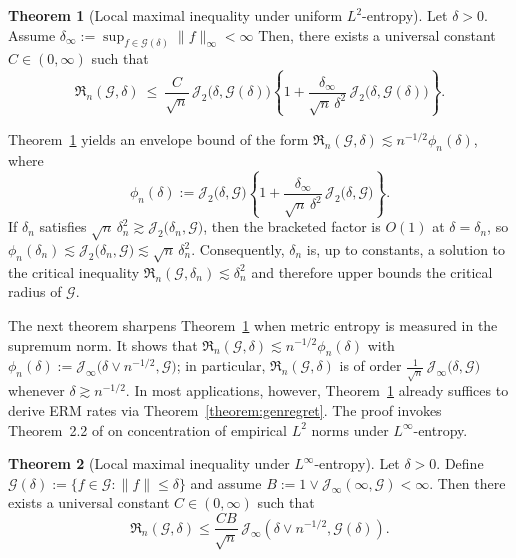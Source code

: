 \documentclass[11pt]{article}
\theoremstyle{plain}
\theoremstyle{definition} %
\newtheorem{theorem}{Theorem}
\begin{document}
\begin{theorem}[Local maximal inequality under
uniform $L^2$-entropy]
\label{theorem::maximaluniform}
Let $\delta >0$. Assume $\delta_{\infty}
:= \sup_{f \in \mathcal{G}(\delta)}\|f\|_{\infty} < \infty$
Then, there exists a universal constant $C \in (0,\infty)$ such that
\[
\mathfrak{R}_n(\mathcal{G},\delta)
\ \le\
\frac{C}{\sqrt{n}}\,\mathcal{J}_2\bigl(\delta,\mathcal{G}(\delta)\bigr)
\left\{
1
+
\frac{\delta_{\infty}}{\sqrt{n}\,\delta^2}\,
\mathcal{J}_2\bigl(\delta,\mathcal{G}(\delta)\bigr)
\right\}.
\]
\end{theorem}
Theorem~\ref{theorem::maximaluniform} yields an envelope bound of the form
\(\mathfrak{R}_n(\mathcal{G},\delta)\lesssim n^{-1/2}\phi_n(\delta)\), where
\[
\phi_n(\delta)
:=
\mathcal{J}_2\bigl(\delta,\mathcal{G}\bigr)
\left\{
1+\frac{\delta_{\infty}}{\sqrt{n}\,\delta^2}\,\mathcal{J}_2\bigl(\delta,\mathcal{G}\bigr)
\right\}.
\]
If $\delta_n$ satisfies \(\sqrt{n}\,\delta_n^2 \gtrsim \mathcal{J}_2\bigl(\delta_n,\mathcal{G}\bigr)\), then the bracketed factor is $O(1)$ at $\delta=\delta_n$, so \(\phi_n(\delta_n)\lesssim \mathcal{J}_2\bigl(\delta_n,\mathcal{G}\bigr)\lesssim \sqrt{n}\,\delta_n^2\).
Consequently, $\delta_n$ is, up to constants, a solution to the critical inequality \(\mathfrak{R}_n(\mathcal{G},\delta_n)\lesssim \delta_n^2\) and therefore upper bounds the critical radius of $\mathcal{G}$.

The next theorem sharpens Theorem~\ref{theorem::maximaluniform} when metric entropy is measured in the supremum norm. It shows that \(\mathfrak{R}_n(\mathcal{G},\delta)\lesssim n^{-1/2}\phi_n(\delta)\) with \(\phi_n(\delta):=\mathcal{J}_\infty\bigl(\delta\vee n^{-1/2},\mathcal{G}\bigr)\); in particular, \(\mathfrak{R}_n(\mathcal{G},\delta)\) is of order \(\frac{1}{\sqrt{n}}\,\mathcal{J}_\infty\bigl(\delta,\mathcal{G}\bigr)\) whenever \(\delta \gtrsim n^{-1/2}\). In most applications, however, Theorem~\ref{theorem::maximaluniform} already suffices to derive ERM rates via Theorem~\ref{theorem:genregret}. The proof invokes Theorem~2.2 of \citet{van2014uniform} on concentration of empirical \(L^2\) norms under $L^\infty$-entropy.






\begin{theorem}[Local maximal inequality under $L^\infty$-entropy]
\label{theorem::maximalsup}
Let \(\delta > 0\). Define $\mathcal{G}(\delta) := \{ f \in \mathcal{G}: \|f\| \le \delta\}$ and assume
\(B := 1 \vee \mathcal{J}_\infty\left(\infty, \mathcal{G}\right) < \infty\).
Then there exists a universal constant \(C\in(0,\infty)\) such that
\begin{equation*}
\mathfrak{R}_n(\mathcal{G},\delta)
\leq
\frac{C B}{\sqrt{n}}\,\mathcal{J}_\infty(\delta \vee n^{-1/2},\mathcal{G}(\delta)).
\end{equation*}
\end{theorem}
\end{document}
